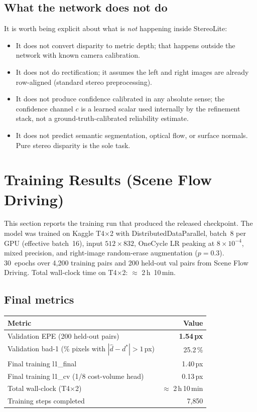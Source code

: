\documentclass[11pt,a4paper]{article}
\begin{document}
\subsection{What the network does not do}

It is worth being explicit about what is \emph{not} happening inside
StereoLite:
\begin{itemize}[leftmargin=*, topsep=1pt, itemsep=0pt]
  \item It does not convert disparity to metric depth; that happens
    outside the network with known camera calibration.
  \item It does not do rectification; it assumes the left and right
    images are already row-aligned (standard stereo preprocessing).
  \item It does not produce confidence calibrated in any absolute
    sense; the confidence channel $c$ is a learned scalar used
    internally by the refinement stack, not a ground-truth-calibrated
    reliability estimate.
  \item It does not predict semantic segmentation, optical flow, or
    surface normals. Pure stereo disparity is the sole task.
\end{itemize}

\clearpage
\section{Training Results (Scene Flow Driving)}

This section reports the training run that produced the released
checkpoint. The model was trained on Kaggle T4$\times$2 with
DistributedDataParallel, batch~8 per GPU (effective batch~16), input
$512\!\times\!832$, OneCycle LR peaking at $8\!\times\!10^{-4}$, mixed
precision, and right-image random-erase augmentation (\(p=0.3\)).
30~epochs over 4{,}200 training pairs and 200 held-out val pairs from
Scene Flow Driving. Total wall-clock time on T4$\times$2: $\approx$
2\,h~10\,min.

\subsection{Final metrics}

\begin{center}
\begin{tabular}{lr}
\toprule
Metric & Value \\
\midrule
Validation EPE (200 held-out pairs) & \textbf{1.54\,px} \\
Validation bad-1 (\% pixels with $|\hat{d}-d^*|>1$\,px) & 25.2\,\% \\
Final training l1\_final & 1.40\,px \\
Final training l1\_cv (1/8 cost-volume head) & 0.13\,px \\
Total wall-clock (T4$\times$2) & $\approx$ 2\,h\,10\,min \\
Training steps completed & 7{,}850 \\
\bottomrule
\end{tabular}
\end{center}
\end{document}
